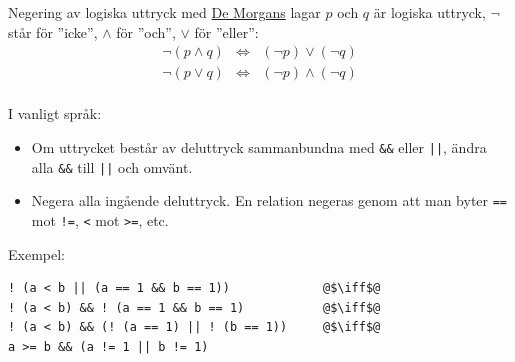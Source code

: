\documentclass{lecturenotes}
\begin{document}
\begin{Slide}{Negering av logiska uttryck med \href{https://en.wikipedia.org/wiki/Augustus_De_Morgan}{De Morgans} lagar}
\footnotesize
$p$ och $q$ är logiska uttryck, $\neg$ står för ''icke'', $\wedge$ för ''och'', $\vee$ för ''eller'':
\begin{eqnarray*}
\neg (p \wedge q) & \Longleftrightarrow & (\neg p) \vee (\neg q)\\
\neg (p \vee q) & \Longleftrightarrow & (\neg p) \wedge (\neg q)\\
\end{eqnarray*}

\vspace{-5mm}
I vanligt språk:
\begin{itemize}
\item Om uttrycket består av deluttryck sammanbundna med \texttt{\&\&} eller \texttt{||}, ändra alla \texttt{\&\&} till \texttt{||} och omvänt.
\item Negera alla ingående deluttryck. En relation negeras genom att man byter \texttt{==} mot \texttt{!=}, \texttt{<} mot \texttt{>=}, etc.
\end{itemize}

Exempel:

\begin{lstlisting}[escapechar=@]
! (a < b || (a == 1 && b == 1))             @$\iff$@
! (a < b) && ! (a == 1 && b == 1)           @$\iff$@
! (a < b) && (! (a == 1) || ! (b == 1))     @$\iff$@
a >= b && (a != 1 || b != 1)
\end{lstlisting}
\end{Slide}
\end{document}

